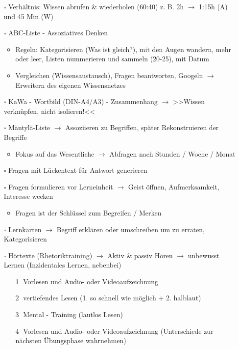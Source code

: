 \documentclass[a4paper,12pt,fleqn,parskip=half]{scrartcl}
\begin{document}
\begin{itemize} 
	\item [$\square$] Verhältnis: Wissen abrufen \& wiederholen (60:40) z. B.  2h $\to$ 1:15h (A) und 45 Min (W)
	\item [$\square$] ABC-Liste - Assoziatives Denken
	\begin{itemize} 
		\item Regeln: Kategorisieren (Was ist gleich?), mit den Augen wandern, mehr oder leer, Listen nummerieren und sammeln (20-25), mit Datum
		\item Vergleichen (Wissensaustausch), Fragen beantworten, Googeln $\to$ Erweitern des eigenen Wissensnetzes
	\end{itemize}
	\item [$\square$] KaWa - Wortbild (DIN-A4/A3) - Zusammenhang $\to$ >>Wissen verknüpfen, nicht isolieren!<<
	\item [$\square$] Mäntylä-Liste $\to$ Assoziieren zu Begriffen, später  Rekonstruieren der Begriffe
	\begin{itemize} 
		\item Fokus auf das Wesentliche $\to$ Abfragen nach Stunden / Woche / Monat
	\end{itemize}
	\item [$\square$] Fragen mit Lückentext für Antwort generieren
	\item [$\square$] Fragen formulieren vor Lerneinheit $\to$ Geist öffnen, Aufmerksamkeit, Interesse wecken
	\begin{itemize} 
		\item Fragen ist der Schlüssel zum Begreifen / Merken
	\end{itemize}
	\item [$\square$] Lernkarten $\to$ Begriff erklären oder umschreiben um zu erraten, Kategorisieren
	\item [$\square$] Hörtexte (Rhetoriktraining)  $\to$ Aktiv \& passiv Hören $\to$ unbewusst Lernen (Inzidentales Lernen, nebenbei)
	\begin{itemize} 
		\item [\textcircled{1}] Vorlesen und Audio- oder Videoaufzeichnung
		\item [\textcircled{2}] vertiefendes Lesen (1. so schnell wie möglich + 2. halblaut)
		\item [\textcircled{3}] Mental - Training (lautlos Lesen)
		\item [\textcircled{4}] Vorlesen und Audio- oder Videoaufzeichnung (Unterschiede zur nächsten Übungsphase wahrnehmen)
	\end{itemize}

\end{itemize}
\end{document}
